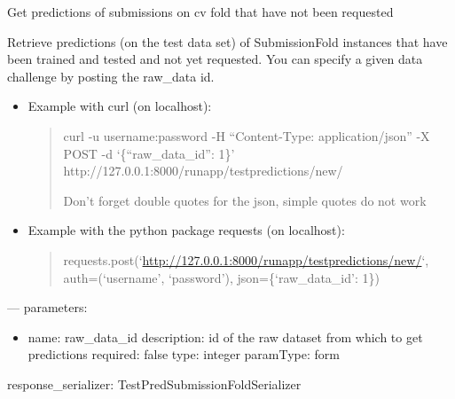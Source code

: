 \documentclass[letterpaper,10pt,english]{sphinxmanual}
\begin{document}

\begin{fulllineitems}
\label{modules/views:runapp.views.GetTestPredictionNew}
Get predictions of submissions on cv fold that have not been requested

\begin{fulllineitems}
\label{modules/views:runapp.views.GetTestPredictionNew.post}
Retrieve predictions (on the test data set) of  SubmissionFold        instances that have been trained and tested and not yet requested.        You can specify a given data challenge by posting the raw\_data id.
\begin{itemize}
\item {} 
Example with curl (on localhost):
\begin{quote}

curl -u username:password -H ``Content-Type: application/json''            -X POST            -d `\{``raw\_data\_id'': 1\}'                http://127.0.0.1:8000/runapp/testpredictions/new/

Don't forget double quotes for the json, simple quotes do not work
\end{quote}

\item {} 
Example with the python package requests (on localhost):
\begin{quote}

requests.post(`\url{http://127.0.0.1:8000/runapp/testpredictions/new/}`,                          auth=(`username', `password'),                          json=\{`raw\_data\_id': 1\})
\end{quote}

\end{itemize}

---
parameters:
\begin{itemize}
\item {} 
name: raw\_data\_id
description: id of the raw dataset from which to get predictions
required: false
type: integer
paramType: form

\end{itemize}

response\_serializer: TestPredSubmissionFoldSerializer

\end{fulllineitems}


\end{fulllineitems}
\end{document}
